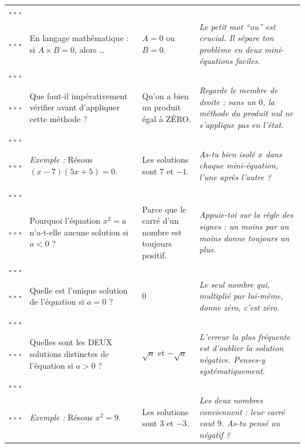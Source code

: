 \documentclass[a4paper,10pt]{article}
\newcommand{\caseseval}{%
    \centering
    $\square\;\square\;\square$ \\
    \vspace{2mm}
    $\square\;\square\;\square$
}
\begin{document}
\begin{center}
\begin{xltabular}{\dimexpr\textwidth-5pt\relax}{|m{2cm}|X|X|X|}
        \caseseval & En langage mathématique : si $A \times B = 0$, alors \dots & $A = 0$ ou $B = 0$. & \footnotesize \textit{Le petit mot ``ou'' est crucial. Il sépare ton problème en deux mini-équations faciles.} \\ \hline
        \caseseval & Que faut-il impérativement vérifier avant d'appliquer cette méthode ? & Qu'on a bien un produit égal à ZÉRO. & \footnotesize \textit{Regarde le membre de droite : sans un $0$, la méthode du produit nul ne s'applique pas en l'état.} \\ \hline
        \caseseval & \textit{Exemple :} Résous $(x-7)(5x+5) = 0$. & Les solutions sont $7$ et $-1$. & \footnotesize \textit{As-tu bien isolé $x$ dans chaque mini-équation, l'une après l'autre ?} \\ \hline
         \\
        \hline
        \caseseval & Pourquoi l'équation $x^2 = a$ n'a-t-elle aucune solution si $a < 0$ ? & Parce que le carré d'un nombre est toujours positif. & \footnotesize \textit{Appuie-toi sur la règle des signes : un moins par un moins donne toujours un plus.} \\ \hline
        \caseseval & Quelle est l'unique solution de l'équation si $a = 0$ ? & $0$ & \footnotesize \textit{Le seul nombre qui, multiplié par lui-même, donne zéro, c'est zéro.} \\ \hline
        \caseseval & Quelles sont les DEUX solutions distinctes de l'équation si $a > 0$ ? & $\sqrt{a}$ et $-\sqrt{a}$ & \footnotesize \textit{L'erreur la plus fréquente est d'oublier la solution négative. Penses-y systématiquement.} \\ \hline
        \caseseval & \textit{Exemple :} Résous $x^2 = 9$. & Les solutions sont $3$ et $-3$. & \footnotesize \textit{Les deux nombres conviennent : leur carré vaut $9$. As-tu pensé au négatif ?} \\ \hline

    \end{xltabular}
\end{center}
\end{document}
